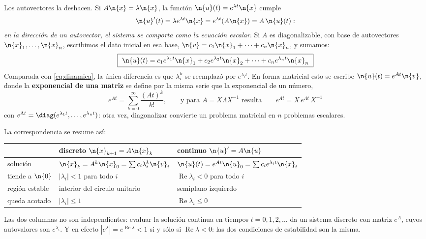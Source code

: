 Los autovectores la deshacen. Si $A\n{x}=\lambda\n{x}$, la función
$\n{u}(t)=e^{\lambda t}\n{x}$ cumple
\[
\n{u}'(t)=\lambda e^{\lambda t}\n{x}=e^{\lambda t}(A\n{x})=A\,\n{u}(t):
\]
\emph{en la dirección de un autovector, el sistema se comporta como la ecuación escalar}.
Si $A$ es diagonalizable, con base de autovectores $\n{x}_1,\dots,\n{x}_n$, escribimos el
dato inicial en esa base, $\n{v}=c_1\n{x}_1+\cdots+c_n\n{x}_n$, y sumamos:
\begin{equation}\label{eq:dinamica-continua}
\boxed{\ \n{u}(t)=c_1e^{\lambda_1 t}\n{x}_1+c_2e^{\lambda_2 t}\n{x}_2
+\cdots+c_ne^{\lambda_n t}\n{x}_n\ }
\end{equation}
Comparada con \eqref{eq:dinamica}, la única diferencia es que $\lambda_i^{k}$ se
reemplazó por $e^{\lambda_i t}$. En forma matricial esto se escribe
$\n{u}(t)=e^{At}\n{v}$, donde la \textbf{exponencial de una matriz} se define por la
misma serie que la exponencial de un número,
\[
e^{At}=\sum_{k=0}^{\infty}\frac{(At)^k}{k!},
\qquad\text{y para $A=X\Lambda X^{-1}$ resulta}\qquad
e^{At}=X\,e^{\Lambda t}\,X^{-1}
\]
con $e^{\Lambda t}=\diag(e^{\lambda_1t},\dots,e^{\lambda_nt})$: otra vez, diagonalizar
convierte un problema matricial en $n$ problemas escalares.

\begin{remark}
La correspondencia se resume así:
\begin{center}
\renewcommand{\arraystretch}{1.3}
\begin{tabular}{@{}lll@{}}
\hline
 & \textbf{discreto} $\n{x}_{k+1}=A\n{x}_k$ & \textbf{continuo} $\n{u}'=A\n{u}$\\
\hline
solución & $\n{x}_k=A^k\n{x}_0=\sum c_i\lambda_i^{k}\n{v}_i$
         & $\n{u}(t)=e^{At}\n{u}_0=\sum c_ie^{\lambda_i t}\n{x}_i$\\
tiende a $\n{0}$ & $|\lambda_i|<1$ para todo $i$ & $\operatorname{Re}\lambda_i<0$ para todo $i$\\
región estable & interior del círculo unitario & semiplano izquierdo\\
queda acotado & $|\lambda_i|\le1$ & $\operatorname{Re}\lambda_i\le0$\\
\hline
\end{tabular}
\end{center}
Las dos columnas no son independientes: evaluar la solución continua en tiempos
$t=0,1,2,\dots$ da un sistema discreto con matriz $e^{A}$, cuyos autovalores son
$e^{\lambda_i}$. Y en efecto $|e^{\lambda}|=e^{\operatorname{Re}\lambda}<1$ si y sólo si
$\operatorname{Re}\lambda<0$: las dos condiciones de estabilidad son la misma.
\end{remark}

